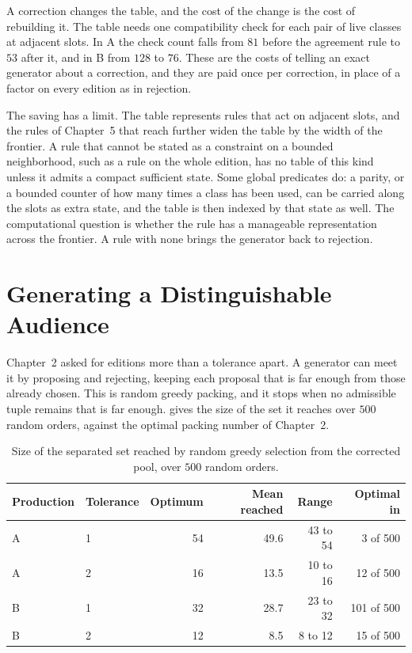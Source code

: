 \documentclass[11pt,twoside,openright]{book}
\theoremstyle{plain}
\theoremstyle{definition}
\theoremstyle{remark}
\begin{document}
A correction changes the table, and the cost of the change is the cost of rebuilding it. The table needs one compatibility check for each pair of live classes at adjacent slots. In A the check count falls from $81$ before the agreement rule to $53$ after it, and in B from $128$ to $76$. These are the costs of telling an exact generator about a correction, and they are paid once per correction, in place of a factor on every edition as in rejection.

The saving has a limit. The table represents rules that act on adjacent slots, and the rules of Chapter~5 that reach further widen the table by the width of the frontier. A rule that cannot be stated as a constraint on a bounded neighborhood, such as a rule on the whole edition, has no table of this kind unless it admits a compact sufficient state. Some global predicates do: a parity, or a bounded counter of how many times a class has been used, can be carried along the slots as extra state, and the table is then indexed by that state as well. The computational question is whether the rule has a manageable representation across the frontier. A rule with none brings the generator back to rejection.

\section{Generating a Distinguishable Audience}\label{sec:audience16}

Chapter~2 asked for editions more than a tolerance apart. A generator can meet it by proposing and rejecting, keeping each proposal that is far enough from those already chosen. This is random greedy packing, and it stops when no admissible tuple remains that is far enough.  gives the size of the set it reaches over $500$ random orders, against the optimal packing number of Chapter~2.

\begin{table}[ht]
\centering
\begin{tabular}{@{}llrrrr@{}}
\toprule
Production & Tolerance & Optimum & Mean reached & Range & Optimal in\\
\midrule
A & 1 & 54 & 49.6 & 43 to 54 & 3 of 500\\
A & 2 & 16 & 13.5 & 10 to 16 & 12 of 500\\
B & 1 & 32 & 28.7 & 23 to 32 & 101 of 500\\
B & 2 & 12 & 8.5 & 8 to 12 & 15 of 500\\
\bottomrule
\end{tabular}
\caption{Size of the separated set reached by random greedy selection from the corrected pool, over $500$ random orders.}\label{tab:greedy16}
\end{table}
\end{document}

